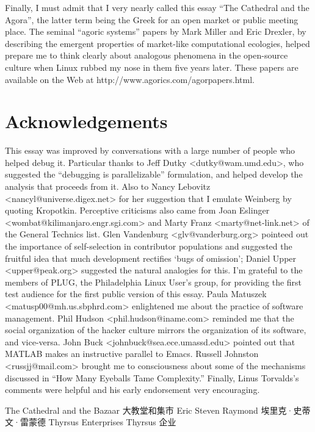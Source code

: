 \documentclass[a4paper,12pt,UTF8,twoside]{ctexbook}
\begin{document}
Finally, I must admit that I very nearly called this essay ``The Cathedral and the Agora'', the latter term being the Greek for an open market or public meeting place. The seminal ``agoric systems'' papers by Mark Miller and Eric Drexler, by describing the emergent properties of market-like computational ecologies, helped prepare me to think clearly about analogous phenomena in the open-source culture when Linux rubbed my nose in them five years later. These papers are available on the Web at http://www.agorics.com/agorpapers.html.

\chapter{Acknowledgements}

This essay was improved by conversations with a large number of people who helped debug it. Particular thanks to Jeff Dutky <dutky@wam.umd.edu>, who suggested the ``debugging is parallelizable'' formulation, and helped develop the analysis that proceeds from it. Also to Nancy Lebovitz <nancyl@universe.digex.net> for her suggestion that I emulate Weinberg by quoting Kropotkin. Perceptive criticisms also came from Joan Eslinger <wombat@kilimanjaro.engr.sgi.com> and Marty Franz <marty@net-link.net> of the General Technics list. Glen Vandenburg <glv@vanderburg.org> pointeed out the importance of self-selection in contributor populations and suggested the fruitful idea that much development rectifies `bugs of omission'; Daniel Upper <upper@peak.org> suggested the natural analogies for this. I'm grateful to the members of PLUG, the Philadelphia Linux User's group, for providing the first test audience for the first public version of this essay. Paula Matuszek <matusp00@mh.us.sbphrd.com> enlightened me about the practice of software management. Phil Hudson <phil.hudson@iname.com> reminded me that the social organization of the hacker culture mirrors the organization of its software, and vice-versa. John Buck <johnbuck@sea.ece.umassd.edu> pointed out that MATLAB makes an instructive parallel to Emacs. Russell Johnston <russjj@mail.com> brought me to consciousness about some of the mechanisms discussed in ``How Many Eyeballs Tame Complexity.'' Finally, Linus Torvalds's comments were helpful and his early endorsement very encouraging.






The Cathedral and the Bazaar
大教堂和集市
Eric Steven Raymond  埃里克·史蒂文·雷蒙德
Thyrsus Enterprises  Thyrsus 企业
\end{document}
